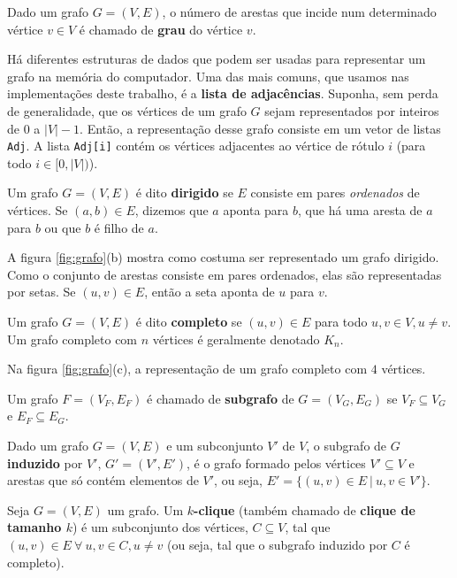 Dado um grafo $G = (V, E)$, o número de arestas que incide num determinado vértice $v \in V$ é chamado de \textbf{grau} do vértice $v$.

Há diferentes estruturas de dados que podem ser usadas para representar um grafo na memória do computador. Uma das mais comuns, que usamos nas implementações deste trabalho, é a \textbf{lista de adjacências}. Suponha, sem perda de generalidade, que os vértices de um grafo $G$ sejam representados por inteiros de $0$ a $|V|-1$. Então, a representação desse grafo consiste em um vetor de listas {\tt Adj}. A lista {\tt Adj[i]} contém os vértices adjacentes ao vértice de rótulo $i$ (para todo $i \in [0, |V|)$).

\vspace{2em}

Um grafo $G = (V, E)$ é dito \textbf{dirigido} se $E$ consiste em pares \emph{ordenados} de vértices. Se $(a, b) \in E$, dizemos que $a$ aponta para $b$, que há uma aresta de $a$ para $b$ ou que $b$ é filho de $a$.

A figura \ref{fig:grafo}(b) mostra como costuma ser representado um grafo dirigido. Como o conjunto de arestas consiste em pares ordenados, elas são representadas por setas. Se $(u, v) \in E$, então a seta aponta de $u$ para $v$.

\vspace{2em}

Um grafo $G = (V, E)$ é dito \textbf{completo} se $(u, v) \in E$ para todo $u, v \in V, u \neq v$. Um grafo completo com $n$ vértices é geralmente denotado $K_n$.

Na figura \ref{fig:grafo}(c), a representação de um grafo completo com $4$ vértices.

\vspace{2em}

Um grafo $F = (V_F, E_F)$ é chamado de \textbf{subgrafo} de $G = (V_G, E_G)$ se $V_F \subseteq V_G$ e $E_F \subseteq E_G$.

Dado um grafo $G = (V, E)$ e um subconjunto $V'$ de $V$, o subgrafo de $G$ \textbf{induzido} por $V'$, $G' = (V', E')$, é o grafo formado pelos vértices $V' \subseteq V$ e arestas que só contém elementos de $V'$, ou seja, $E' = \{(u, v) \in E \ | \  u, v \in V'\}$.

\vspace{2em}

Seja $G = (V, E)$ um grafo. Um \textbf{$k$-clique} (também chamado de \textbf{clique de tamanho $k$}) é um subconjunto dos vértices, $C \subseteq V$, tal que $(u, v) \in E \ \forall \ u, v \in C, u \neq v$ (ou seja, tal que o subgrafo induzido por $C$ é completo).

